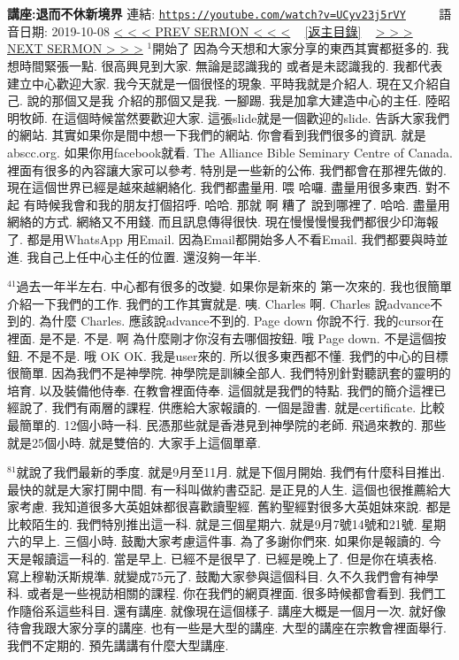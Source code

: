 \documentclass{book}
\begin{document}
\section{}
\label{sec:UCyv23j5rVY}
\textbf{講座:退而不休新境界}
\newline
\newline
連結: \href{https://youtube.com/watch?v=UCyv23j5rVY}{\texttt{https://youtube.com/watch?v=UCyv23j5rVY}} ~~~~ 語音日期: 2019-10-08
\newline
\newline
\hyperref[sec:code]{\small{< < < PREV SERMON < < <}}
~
\hyperref[sec:index]{\small{[返主目錄]}}
~
\hyperref[sec:JwFqk5bcKhM]{\small{> > > NEXT SERMON > > >}}
\newline
\newline
$^{1}$開始了 因為今天想和大家分享的東西其實都挺多的.
我想時間緊張一點.
很高興見到大家.
無論是認識我的 或者是未認識我的.
我都代表建立中心歡迎大家.
我今天就是一個很怪的現象.
平時我就是介紹人.
現在又介紹自己.
說的那個又是我 介紹的那個又是我.
一腳踢.
我是加拿大建造中心的主任.
陸昭明牧師.
在這個時候當然要歡迎大家.
這張slide就是一個歡迎的slide.
告訴大家我們的網站.
其實如果你是間中想一下我們的網站.
你會看到我們很多的資訊.
就是abscc.org.
如果你用facebook就看.
The Alliance Bible Seminary Centre of Canada.
裡面有很多的內容讓大家可以參考.
特別是一些新的公佈.
我們都會在那裡先做的.
現在這個世界已經是越來越網絡化.
我們都盡量用.
喂 哈囉.
盡量用很多東西.
對不起 有時候我會和我的朋友打個招呼.
哈哈.
那就 啊 糟了 說到哪裡了.
哈哈.
盡量用網絡的方式.
網絡又不用錢.
而且訊息傳得很快.
現在慢慢慢慢我們都很少印海報了.
都是用WhatsApp 用Email.
因為Email都開始多人不看Email.
我們都要與時並進.
我自己上任中心主任的位置.
還沒夠一年半.

$^{41}$過去一年半左右.
中心都有很多的改變.
如果你是新來的 第一次來的.
我也很簡單介紹一下我們的工作.
我們的工作其實就是.
咦.
Charles 啊.
Charles 說advance不到的.
為什麼 Charles.
應該說advance不到的.
Page down 你說不行.
我的cursor在裡面.
是不是.
不是.
啊 為什麼剛才你沒有去哪個按鈕.
哦 Page down.
不是這個按鈕.
不是不是.
哦 OK OK.
我是user來的.
所以很多東西都不懂.
我們的中心的目標很簡單.
因為我們不是神學院.
神學院是訓練全部人.
我們特別針對聽訊套的靈明的培育.
以及裝備他侍奉.
在教會裡面侍奉.
這個就是我們的特點.
我們的簡介這裡已經說了.
我們有兩層的課程.
供應給大家報讀的.
一個是證書.
就是certificate.
比較最簡單的.
12個小時一科.
民憑那些就是香港見到神學院的老師.
飛過來教的.
那些就是25個小時.
就是雙倍的.
大家手上這個單章.

$^{81}$就說了我們最新的季度.
就是9月至11月.
就是下個月開始.
我們有什麼科目推出.
最快的就是大家打開中間.
有一科叫做約書亞記.
是正見的人生.
這個也很推薦給大家考慮.
我知道很多大英姐妹都很喜歡讀聖經.
舊約聖經對很多大英姐妹來說.
都是比較陌生的.
我們特別推出這一科.
就是三個星期六.
就是9月7號14號和21號.
星期六的早上.
三個小時.
鼓勵大家考慮這件事.
為了多謝你們來.
如果你是報讀的.
今天是報讀這一科的.
當是早上.
已經不是很早了.
已經是晚上了.
但是你在填表格.
寫上穆勒沃斯規準.
就變成75元了.
鼓勵大家參與這個科目.
久不久我們會有神學科.
或者是一些視訪相關的課程.
你在我們的網頁裡面.
很多時候都會看到.
我們工作隨俗系這些科目.
還有講座.
就像現在這個樣子.
講座大概是一個月一次.
就好像待會我跟大家分享的講座.
也有一些是大型的講座.
大型的講座在宗教會裡面舉行.
我們不定期的.
預先講講有什麼大型講座.
\end{document}
